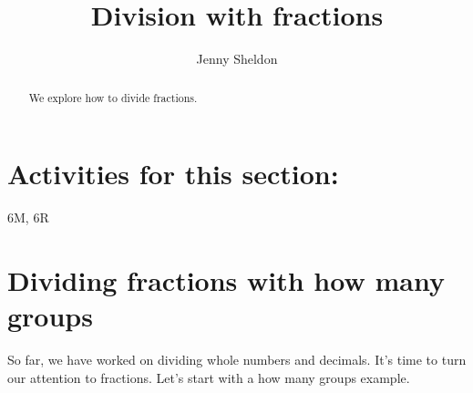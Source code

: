 \documentclass{ximera}
\title{Division with fractions}
\author{Jenny Sheldon}
\begin{document}
\begin{abstract}
We explore how to divide fractions.
\end{abstract}
\maketitle

\section{Activities for this section:} 6M, 6R

\section{Dividing fractions with how many groups}

So far, we have worked on dividing whole numbers and decimals. It's time to turn our attention to fractions. Let's start with a how many groups example.
\end{document}
